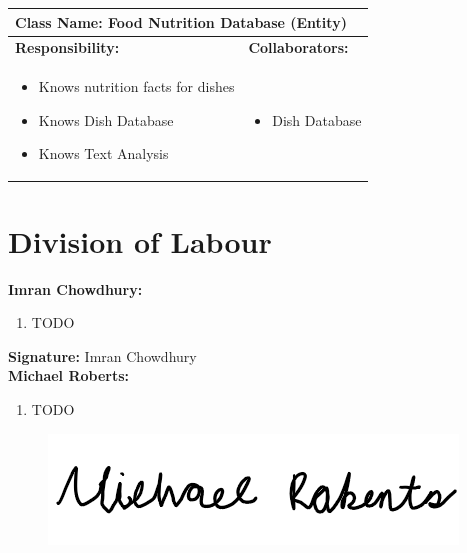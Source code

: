 \documentclass[]{article}
\begin{document}
\begin{table}[H]
	\centering
	\begin{tabular}{|p{7cm}|p{7cm}|}
	\hline 
	 \multicolumn{2}{|l|}{\textbf{Class Name:} Food Nutrition Database (Entity) }\\
	\hline
	\textbf{Responsibility:} & \textbf{Collaborators:} \\
	\hline
	\raggedright
	\begin{itemize}
		\item Knows nutrition facts for dishes
		\item Knows Dish Database
		\item Knows Text Analysis
	\end{itemize}
	\vspace{1in} & 
	\begin{itemize}
		\item Dish Database
	\end{itemize} \\
	\hline
	\end{tabular}
\end{table}




\appendix
\section{Division of Labour}
\label{sec:division_of_labour}
\textbf{Imran Chowdhury:}
\begin{enumerate}
	\item TODO
\end{enumerate}

\textbf{Signature:} Imran Chowdhury \\

\textbf{Michael Roberts:}
\begin{enumerate}
	\item TODO
\end{enumerate}

\begin{figure}[H]
 	\centering
    \includegraphics[width=\textwidth]{image/A_Michael_Roberts_Signature.png}
\end{figure}
\end{document}
